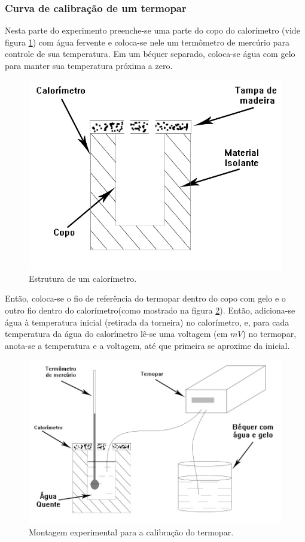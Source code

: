 \documentclass[12pt,a4paper]{article}
\begin{document}
\subsubsection{Curva de calibração de um termopar}

Nesta parte do experimento preenche-se uma parte do copo do calorímetro (vide figura \ref{calorimetro}) com água fervente e coloca-se nele um termômetro de mercúrio para controle de sua temperatura. Em um béquer separado, coloca-se água com gelo para manter sua temperatura próxima a zero.\\

\begin{figure}[!htbp]
\centering
\includegraphics[scale=0.3]{Fig6a1.jpg}
\caption{Estrutura de um calorímetro.}
\label{calorimetro}
\end{figure}

Então, coloca-se o fio de referência do termopar dentro do copo com gelo e o outro fio dentro do calorímetro(como mostrado na figura \ref{exptermopar}). Então, adiciona-se água à temperatura inicial (retirada da torneira) no calorímetro, e, para cada temperatura da água do calorímetro lê-se uma voltagem (em $mV$) no termopar, anota-se a temperatura e a voltagem, até que primeira se aproxime da inicial.

\begin{figure}[!htbp]
\centering
\includegraphics[scale=0.3]{Fig6a2.jpg}
\caption{Montagem experimental para a calibração do termopar.}
\label{exptermopar}
\end{figure}
\end{document}
